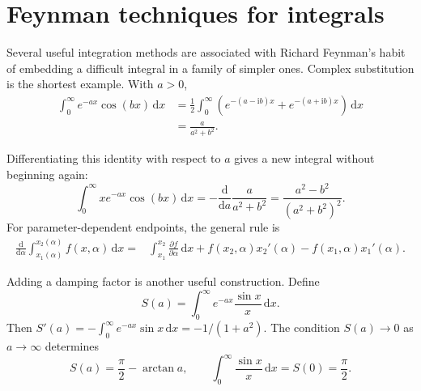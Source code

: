 \section{Feynman techniques for integrals}

Several useful integration methods are associated with Richard Feynman's habit of embedding a difficult integral in a family of simpler ones. Complex substitution is the shortest example. With $a>0$,
\begin{align}
\int_0^\infty e^{-ax}\cos(bx)\,\mathrm{d}x
&=\frac12\int_0^\infty\left(e^{-(a-\mathrm{i}b)x}+e^{-(a+\mathrm{i}b)x}\right)\,\mathrm{d}x\\
&=\frac{a}{a^2+b^2}.
\end{align}

Differentiating this identity with respect to $a$ gives a new integral without beginning again:
\begin{equation}
\int_0^\infty xe^{-ax}\cos(bx)\,\mathrm{d}x
=-\frac{\mathrm{d}}{\mathrm{d}a}\frac{a}{a^2+b^2}
=\frac{a^2-b^2}{(a^2+b^2)^2}.
\end{equation}
For parameter-dependent endpoints, the general rule is
\begin{align}
\frac{\mathrm{d}}{\mathrm{d}\alpha}\int_{x_1(\alpha)}^{x_2(\alpha)}f(x,\alpha)\,\mathrm{d}x
={}&\int_{x_1}^{x_2}\frac{\partial f}{\partial\alpha}\,\mathrm{d}x
+f(x_2,\alpha)x_2'(\alpha)-f(x_1,\alpha)x_1'(\alpha).
\end{align}

Adding a damping factor is another useful construction. Define
\begin{equation}
S(a)=\int_0^\infty e^{-ax}\frac{\sin x}{x}\,\mathrm{d}x.
\end{equation}
Then $S'(a)=-\int_0^\infty e^{-ax}\sin x\,\mathrm{d}x=-1/(1+a^2)$. The condition $S(a)\to0$ as $a\to\infty$ determines
\begin{equation}
S(a)=\frac{\pi}{2}-\arctan a,
\qquad \int_0^\infty\frac{\sin x}{x}\,\mathrm{d}x=S(0)=\frac{\pi}{2}.
\end{equation}